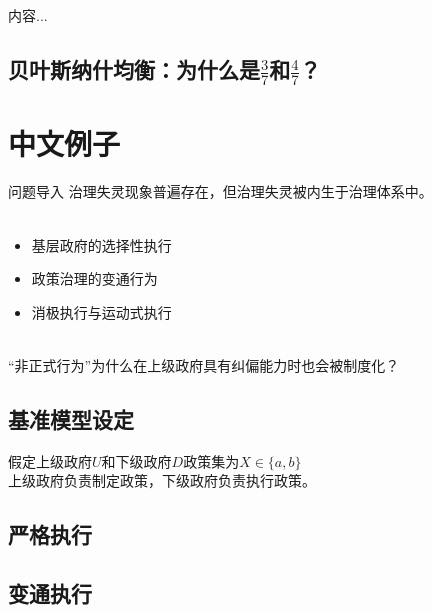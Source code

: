 \documentclass{beamer}
\begin{document}
\begin{frame}
	内容...
\end{frame}
\subsection{贝叶斯纳什均衡：为什么是$\frac{3}{7}$和$\frac{4}{7}$？}



\section{中文例子}

\begin{frame}{问题导入}
	治理失灵现象普遍存在，但治理失灵被内生于治理体系中。\\~\\
	\begin{itemize}
		\item 基层政府的选择性执行
		\item 政策治理的变通行为
		\item 消极执行与运动式执行 \\~\\
	\end{itemize}
	
	“非正式行为”为什么在上级政府具有纠偏能力时也会被制度化？\\
	
\end{frame}

\subsection{基准模型设定}

\begin{frame}
	假定上级政府$U$和下级政府$D$政策集为$X\in\{a,b\}$\\
	上级政府负责制定政策，下级政府负责执行政策。\\
\end{frame}
\subsection{严格执行}

\subsection{变通执行}
\end{document}
